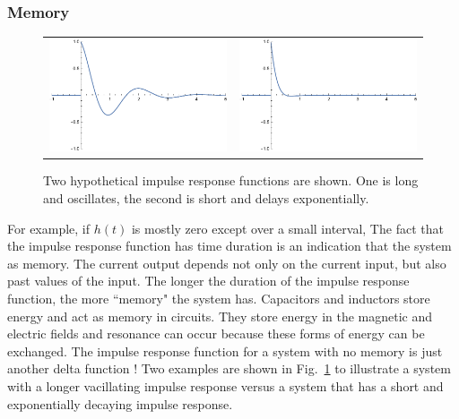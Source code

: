 \subsubsection{Memory}
\begin{figure}[tb]
\begin{tabular}{cc}
\includegraphics[width=.5\columnwidth]{impulse1_long.pdf} &
\includegraphics[width=.5\columnwidth]{impulse2_short.pdf} \\
\end{tabular}
\caption{Two hypothetical impulse response functions are shown.  One is long and oscillates, the second is short and delays exponentially.}
\label{fig:memory}
\end{figure}
For example, if $h(t)$ is mostly zero except over a small interval, 
The fact that the impulse response function has time duration is an indication that the system as memory.  The current output depends not only on the current input, but also past values of the input.  The longer the duration of the impulse response function, the more ``memory" the system has.  Capacitors and inductors store energy and act as memory in circuits.  They store energy in the magnetic and electric fields and resonance can occur because these forms of energy can be exchanged.  The impulse response function for a system with no memory is just another delta function !  Two examples are shown in Fig.~\ref{fig:memory} to illustrate a system with a longer vacillating impulse response versus a system that has a short and exponentially decaying impulse response.  
